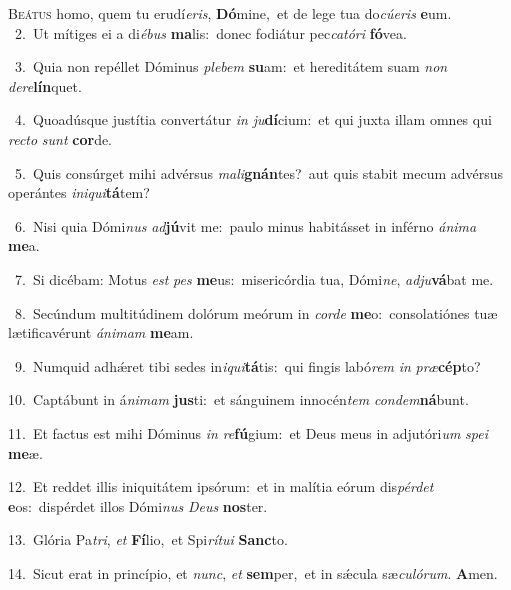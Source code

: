 \lettrine{\initial\textcolor{\initialcolor}{B}}{eátus} homo, quem tu erudí\-\textit{e}\-\textit{ris}, \textbf{Dó}\-mine,~\star et de lege tua do\-\textit{cú}\-\textit{e}\textit{ris} \textbf{e}\-um.\\
{\numbfont\textcolor{\numbcolor}{~2.}}~Ut mítiges ei a di\-\textit{é}\-\textit{bus} \textbf{ma}\-lis:~\star donec fodiátur pec\-\textit{ca}\-\textit{tó}\textit{ri} \textbf{fó}\-vea.\par
{\numbfont\textcolor{\numbcolor}{~3.}}~Quia non repéllet Dóminus \textit{ple}\-\textit{bem} \textbf{su}\-am:~\star et hereditátem suam \textit{non} \textit{de}\-\textit{re}\textbf{lín}quet.\par
{\numbfont\textcolor{\numbcolor}{~4.}}~Quoadúsque justítia convertátur \textit{in} \textit{ju}\-\textbf{dí}cium:~\star et qui juxta illam omnes qui \textit{rec}\-\textit{to} \textit{sunt} \textbf{cor}\-de.\par
{\numbfont\textcolor{\numbcolor}{~5.}}~Quis consúrget mihi advérsus \textit{ma}\-\textit{li}\textbf{gnán}tes?~\star aut quis stabit mecum advérsus operántes \textit{in}\-\textit{i}\textit{qui}\textbf{tá}tem?\par
{\numbfont\textcolor{\numbcolor}{~6.}}~Nisi quia Dómi\textit{nus} \textit{ad}\-\textbf{jú}vit me:~\star paulo minus habitásset in inférno \textit{á}\-\textit{ni}\textit{ma} \textbf{me}\-a.\par
{\numbfont\textcolor{\numbcolor}{~7.}}~Si dicébam: Motus \textit{est} \textit{pes} \textbf{me}\-us:~\star misericórdia tua, Dómi\-\textit{ne}\-, \textit{ad}\-\textit{ju}\textbf{vá}bat me.\par
{\numbfont\textcolor{\numbcolor}{~8.}}~Secúndum multitúdinem dolórum meórum in \textit{cor}\-\textit{de} \textbf{me}\-o:~\star consolatiónes tuæ lætificavérunt \textit{á}\-\textit{ni}\textit{mam} \textbf{me}\-am.\par
{\numbfont\textcolor{\numbcolor}{~9.}}~Numquid adhǽret tibi sedes in\-\textit{i}\-\textit{qui}\textbf{tá}tis:~\star qui fingis labó\textit{rem} \textit{in} \textit{præ}\-\textbf{cép}to?\par
{\numbfont\textcolor{\numbcolor}{10.}}~Captábunt in á\-\textit{ni}\-\textit{mam} \textbf{jus}\-ti:~\star et sánguinem innocén\textit{tem} \textit{con}\-\textit{dem}\textbf{ná}bunt.\par
{\numbfont\textcolor{\numbcolor}{11.}}~Et factus est mihi Dóminus \textit{in} \textit{re}\-\textbf{fú}gium:~\star et Deus meus in adjutóri\textit{um} \textit{spe}\-\textit{i} \textbf{me}\-æ.\par
{\numbfont\textcolor{\numbcolor}{12.}}~Et reddet illis iniquitátem ipsórum:~\dagger et in malítia eórum dis\-\textit{pér}\-\textit{det} \textbf{e}\-os:~\star dispérdet illos Dómi\textit{nus} \textit{De}\-\textit{us} \textbf{nos}\-ter.\par
{\numbfont\textcolor{\numbcolor}{13.}}~Glória Pa\-\textit{tri}\-, \textit{et} \textbf{Fí}\-lio,~\star et Spi\-\textit{rí}\-\textit{tu}\textit{i} \textbf{Sanc}\-to.\par
{\numbfont\textcolor{\numbcolor}{14.}}~Sicut erat in princípio, et \textit{nunc}\-, \textit{et} \textbf{sem}\-per,~\star et in sǽcula sæ\-\textit{cu}\-\textit{ló}\textit{rum}. \textbf{A}\-men.\par
